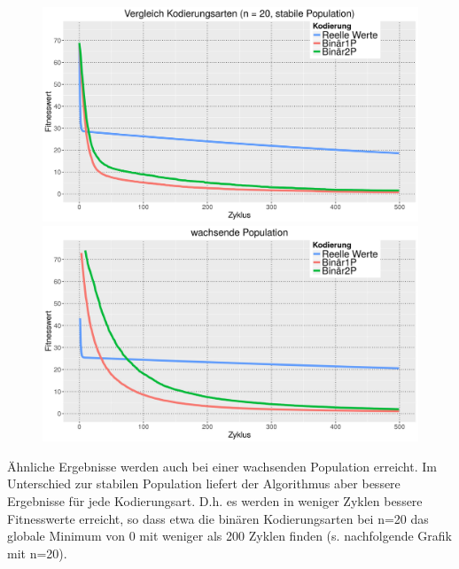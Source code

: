 \documentclass[12pt,
    a4paper,
    headinclude,
    footinclude]{scrreprt}
\begin{document}
\begin{figure}[H]
	\centering
	\begin{minipage}[b]{0.45\textwidth}
		\includegraphics[width=\textwidth]{../abb1_n20_stable.jpeg}
	\end{minipage}
	\hfill
	\begin{minipage}[b]{0.45\textwidth}
		\includegraphics[width=\textwidth]{../abb2_stable_growing.jpeg}
	\end{minipage}
\end{figure}


Ähnliche Ergebnisse werden auch bei einer wachsenden Population erreicht. Im Unterschied zur stabilen Population liefert der Algorithmus aber bessere Ergebnisse für jede Kodierungsart. D.h. es werden in weniger Zyklen bessere Fitnesswerte erreicht, so dass etwa die binären Kodierungsarten bei n=20  das globale Minimum von 0 mit weniger als 200 Zyklen finden (s. nachfolgende Grafik mit n=20). 
\end{document}
